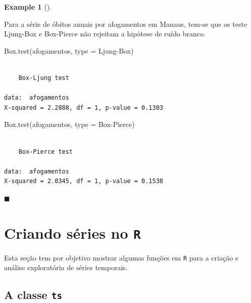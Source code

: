 \documentclass[
  letterpaper,
  DIV=11,
  numbers=noendperiod]{scrreprt}
\newenvironment{Shaded}{\begin{snugshade}}{\end{snugshade}}
\newcommand{\AttributeTok}[1]{\textcolor[rgb]{0.40,0.45,0.13}{#1}}
\newcommand{\FunctionTok}[1]{\textcolor[rgb]{0.28,0.35,0.67}{#1}}
\newcommand{\NormalTok}[1]{\textcolor[rgb]{0.00,0.23,0.31}{#1}}
\newcommand{\StringTok}[1]{\textcolor[rgb]{0.13,0.47,0.30}{#1}}
\theoremstyle{plain}
\theoremstyle{definition}
\newtheorem{example}{Example}[chapter]
\theoremstyle{definition}
\theoremstyle{remark}
\begin{document}
\begin{example}[]\protect\hypertarget{exm-afogamentos_testes}{}\label{exm-afogamentos_testes}

Para a série de óbitos anuais por afogamentos em Manaus, tem-se que os
teste Ljung-Box e Box-Pierce não rejeitam a hipótese de ruído branco.

\begin{Shaded}
\begin{Highlighting}[]
\FunctionTok{Box.test}\NormalTok{(afogamentos, }\AttributeTok{type =} \StringTok{\textquotesingle{}Ljung{-}Box\textquotesingle{}}\NormalTok{)}
\end{Highlighting}
\end{Shaded}

\begin{verbatim}

    Box-Ljung test

data:  afogamentos
X-squared = 2.2888, df = 1, p-value = 0.1303
\end{verbatim}

\begin{Shaded}
\begin{Highlighting}[]
\FunctionTok{Box.test}\NormalTok{(afogamentos, }\AttributeTok{type =} \StringTok{\textquotesingle{}Box{-}Pierce\textquotesingle{}}\NormalTok{)}
\end{Highlighting}
\end{Shaded}

\begin{verbatim}

    Box-Pierce test

data:  afogamentos
X-squared = 2.0345, df = 1, p-value = 0.1538
\end{verbatim}

\(\blacksquare\)

\end{example}


\hypertarget{criando-suxe9ries-no-r}{%
\chapter{\texorpdfstring{Criando séries no
\texttt{R}}{Criando séries no R}}\label{criando-suxe9ries-no-r}}

Esta seção tem por objetivo mostrar algumas funções em \texttt{R} para a
criação e análise exploratória de séries temporais.

\hypertarget{a-classe-ts}{%
\section{\texorpdfstring{A classe
\texttt{ts}}{A classe ts}}\label{a-classe-ts}}
\end{document}

